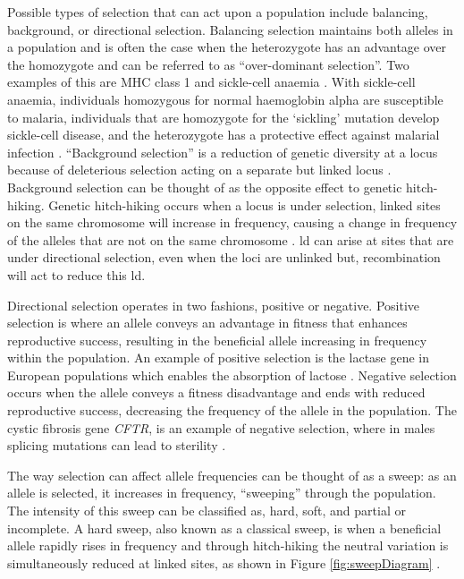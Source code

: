 \documentclass[twoside,openright]{report}
\begin{document}
Possible types of selection that can act upon a population include
balancing, background, or directional selection. Balancing selection
maintains both alleles in a population and is often the case when the
heterozygote has an advantage over the homozygote and can be referred to
as ``over-dominant selection''. Two examples of this are MHC class 1
\citep{Hughes1988} and sickle-cell anaemia \citep{Allison1956}. With
sickle-cell anaemia, individuals homozygous for normal haemoglobin alpha
are susceptible to malaria, individuals that are homozygote for the
`sickling' mutation develop sickle-cell disease, and the heterozygote
has a protective effect against malarial infection \citep{Aidoo2002}.
``Background selection'' is a reduction of genetic diversity at a locus
because of deleterious selection acting on a separate but linked locus
\citep{Charlesworth1993}. Background selection can be thought of as the
opposite effect to genetic hitch-hiking. Genetic hitch-hiking occurs
when a locus is under selection, linked sites on the same chromosome
will increase in frequency, causing a change in frequency of the alleles
that are not on the same chromosome \citep{Smith1974}. \Gls{ld} can
arise at sites that are under directional selection, even when the loci
are unlinked \citep{Felsenstein1965} but, recombination will act to
reduce this \gls{ld}.

Directional selection operates in two fashions, positive or negative.
Positive selection is where an allele conveys an advantage in fitness
that enhances reproductive success, resulting in the beneficial allele
increasing in frequency within the population. An example of positive
selection is the lactase gene in European populations which enables the
absorption of lactose \citep{Bersaglieri2004}. Negative selection occurs
when the allele conveys a fitness disadvantage and ends with reduced
reproductive success, decreasing the frequency of the allele in the
population. The cystic fibrosis gene \emph{CFTR}, is an example of
negative selection, where in males splicing mutations can lead to
sterility \citep{Pagani2005}.

The way selection can affect allele frequencies can be thought of as a
sweep: as an allele is selected, it increases in frequency, ``sweeping''
through the population. The intensity of this sweep can be classified
as, hard, soft, and partial or incomplete. A hard sweep, also known as a
classical sweep, is when a beneficial allele rapidly rises in frequency
and through hitch-hiking the neutral variation is simultaneously reduced
at linked sites, as shown in Figure \ref{fig:sweepDiagram}
\citep{Smith1974, Hermisson2005, Nielsen2005, Hermisson2017}.
\end{document}
